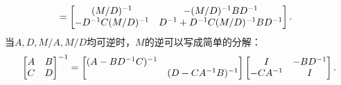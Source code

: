 \begin{theorem}
\begin{subequations}
\begin{align}
			\label{eqn:[AB;CD]-1=M/D}
			&= \begin{bmatrix}
				(M/D)^{-1}&-(M/D)^{-1} BD^{-1}\\
				-D^{-1} C(M/D)^{-1}&D^{-1} + D^{-1} C(M/D)^{-1} BD^{-1}
			\end{bmatrix}.
		\end{align}
	\end{subequations}
	\tcblower 
	当$A,D,M/A,M/D$均可逆时，$M$的逆可以写成简单的分解：
	\begin{equation}\label{eq:la-block-inverse-factorization}
		\begin{bmatrix}
			A&B\\C&D
		\end{bmatrix}^{-1} = \begin{bmatrix}
			(A - BD^{-1} C)^{-1}\\ &(D - CA^{-1} B)^{-1}
		\end{bmatrix}\begin{bmatrix}
			I&-BD^{-1}\\-CA^{-1}&I
		\end{bmatrix}.
	\end{equation}
\end{theorem}

